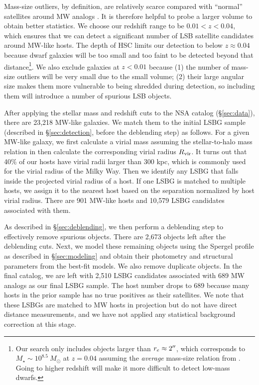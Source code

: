 \documentclass[twocolumn,astrosymb,twocolappendix]{aastex631}
\begin{document}
\begin{CJK*}{UTF8}{gbsn}
Mass-size outliers, by definition, are relatively scarce compared with ``normal'' satellites around MW analogs \citep{SAGA-II,CarlstenELVES2022}. It is therefore helpful to probe a larger volume to obtain better statistics. We choose our redshift range to be $0.01 < z < 0.04$, which ensures that we can detect a significant number of LSB satellite candidates around MW-like hosts. The depth of HSC limits our detection to below $z \approx 0.04$ because dwarf galaxies will be too small and too faint to be detected beyond that distance\footnote{Our search only includes objects larger than $r_e\approx 2\mbox{$^{\prime\prime}$}$, which corresponds to $M_\star \sim 10^{8.5}\ M_\odot$ at $z=0.04$ assuming the \textit{average} mass-size relation from \citet{ELVES-I}. Going to higher redshift will make it more difficult to detect low-mass dwarfs.}. We also exclude galaxies at $z<0.01$ because (1) the number of mass-size outliers will be very small due to the small volume; (2) their large angular size makes them more vulnerable to being shredded during detection, so including them will introduce a number of spurious LSB objects. 

After applying the stellar mass and redshift cuts to the NSA catalog (\S\ref{sec:data}), there are 23,218 MW-like galaxies. We match them to the initial LSBG sample (described in \S \ref{sec:detection}, before the deblending step) as follows. For a given MW-like galaxy, we first calculate a virial mass assuming the stellar-to-halo mass relation in \citet{Behroozi2010} then calculate the corresponding virial radius $R_{\rm vir}$. It turns out that 40\% of our hosts have virial radii larger than 300 kpc, which is commonly used for the virial radius of the Milky Way. Then we identify any LSBG that falls inside the projected virial radius of a host. If one LSBG is matched to multiple hosts, we assign it to the nearest host based on the separation normalized by host virial radius. There are 901 MW-like hosts and 10,579 LSBG candidates associated with them.

As described in \S\ref{sec:deblending}, we then perform a deblending step to effectively remove spurious objects. There are 2,673 objects left after the deblending cuts. Next, we model these remaining objects using the Spergel profile as described in \S\ref{sec:modeling} and obtain their photometry and structural parameters from the best-fit models. We also remove duplicate objects. In the final catalog, we are left with 2,510 LSBG candidates associated with 689 MW analogs as our final LSBG sample. The host number drops to 689 because many hosts in the prior sample has no true positives as their satellites. We note that these LSBGs are matched to MW hosts in projection but do not have direct distance measurements, and we have not applied any statistical background correction at this stage. 



\end{CJK*}
\end{document}
